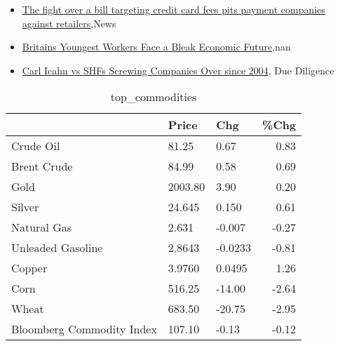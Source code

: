 \documentclass{article}%
\begin{document}
\begin{itemize}
\item%
\href{https://reddit.com/r/Economics/comments/15dw2ds/the\_fight\_over\_a\_bill\_targeting\_credit\_card\_fees/}{The fight over a bill targeting credit card fees pits payment companies against retailers},News%
\item%
\href{https://reddit.com/r/Economics/comments/15dv7qr/britains\_youngest\_workers\_face\_a\_bleak\_economic/}{Britains Youngest Workers Face a Bleak Economic Future},nan%
\item%
\href{https://reddit.com/r/Superstonk/comments/15dwkq8/carl\_icahn\_vs\_shfs\_screwing\_companies\_over\_since/}{Carl Icahn vs SHFs Screwing Companies Over since 2004}, Due Diligence%
\end{itemize}%


\begin{table}[htbp]%
\caption{top\_commodities}%
\centering%
\begin{adjustbox}{width=1\textwidth}%
\begin{tabular}{lllr}
\toprule
                          &   Price &     Chg &  \%Chg \\
\midrule
               Crude Oil  &   81.25 &    0.67 &  0.83 \\
             Brent Crude  &   84.99 &    0.58 &  0.69 \\
                    Gold  & 2003.80 &    3.90 &  0.20 \\
                  Silver  &  24.645 &   0.150 &  0.61 \\
             Natural Gas  &   2.631 &  -0.007 & -0.27 \\
       Unleaded Gasoline  &  2.8643 & -0.0233 & -0.81 \\
                  Copper  &  3.9760 &  0.0495 &  1.26 \\
                    Corn  &  516.25 &  -14.00 & -2.64 \\
                   Wheat  &  683.50 &  -20.75 & -2.95 \\
Bloomberg Commodity Index &  107.10 &   -0.13 & -0.12 \\
\bottomrule
\end{tabular}
%
\end{adjustbox}%
\end{table}

%
\end{document}
